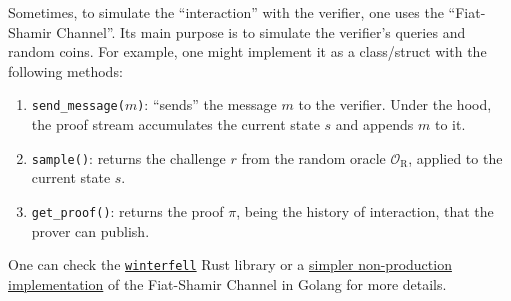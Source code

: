 \documentclass[../lecture-notes.tex]{subfiles}
\begin{document}
\begin{remark}
    Sometimes, to simulate the ``interaction'' with the verifier, one uses the ``Fiat-Shamir Channel''. Its main purpose is to simulate the verifier's queries and random coins. For example, one might implement it as a class/struct with the following methods:
    \begin{enumerate}
        \item \texttt{send\_message($m$)}: ``sends'' the message $m$ to the verifier. Under the hood, the proof stream accumulates the current state $s$ and appends $m$ to it.
        \item \texttt{sample()}: returns the challenge $r$ from the random oracle $\mathcal{O}_{\text{R}}$, applied to the current state $s$.
        \item \texttt{get\_proof()}: returns the proof $\pi$, being the history of interaction, that the prover can publish.
    \end{enumerate}

    One can check the \href{https://github.com/facebook/winterfell/blob/main/prover/src/channel.rs}{\texttt{winterfell}} Rust library or a \href{https://github.com/actuallyachraf/zkstarks/blob/master/fs.go}{simpler non-production implementation} of the Fiat-Shamir Channel in Golang for more details.
\end{remark}
\end{document}
